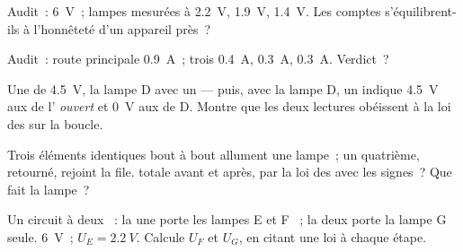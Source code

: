 \begin{exercise}[$\star$]\label{exo:g8:circuit-laws:7}
Audit~:  \qty{6}{V}~; lampes  mesurées à \qty{2.2}{V},
\qty{1.9}{V}, \qty{1.4}{V}. Les comptes s'équilibrent-ils à
l'honnêteté d'un appareil près~?
\end{exercise}

\begin{exercise}[$\star$]\label{exo:g8:circuit-laws:8}
Audit~: route principale \qty{0.9}{A}~; trois  \qty{0.4}{A},
\qty{0.3}{A}, \qty{0.3}{A}. Verdict~?
\end{exercise}

\begin{exercise}[$\star\star$]\label{exo:g8:circuit-laws:9}
Une  de \qty{4.5}{V}, la lampe D  avec un 
--- puis,  avec la lampe D, un  indique
\qty{4.5}{V} aux  de l' \emph{ouvert} et \qty{0}{V}
aux  de D. Montre que les deux lectures obéissent à la loi des
 sur la boucle.
\end{exercise}

\begin{exercise}[$\star\star$]\label{exo:g8:circuit-laws:10}
Trois éléments identiques bout à bout allument une lampe~; un
quatrième, retourné, rejoint la file.  totale avant et après,
par la loi des   avec les signes~? Que fait la
lampe~?
\end{exercise}

\begin{exercise}[$\star\star$]\label{exo:g8:circuit-laws:11}
Un circuit à deux ~: la  une porte les lampes E et F
~; la  deux porte la lampe G seule.  \qty{6}{V}~;
$U_E = \qty{2.2}{V}$. Calcule $U_F$ et $U_G$, en citant une loi à
chaque étape.
\end{exercise}

